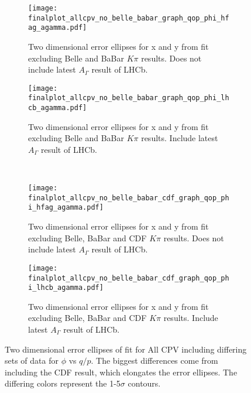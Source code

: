 \begin{figure}[tb]
  \begin{center}
    \begin{subfigure}[b]{0.4\textwidth}
      \centering
      \texttt{[image: finalplot\_allcpv\_no\_belle\_babar\_graph\_qop\_phi\_hfag\_agamma.pdf]}
      \caption{Two dimensional error ellipses for x and y from fit excluding Belle and BaBar $K\pi$ results. Does not include latest $A_\Gamma$ result of LHCb.}
      \label{fig:xy_all_cpv_no_agamma}
    \end{subfigure}%
    \hspace{2mm}
    \begin{subfigure}[b]{0.4\textwidth}
      \centering
      \texttt{[image: finalplot\_allcpv\_no\_belle\_babar\_graph\_qop\_phi\_lhcb\_agamma.pdf]}
      \caption{Two dimensional error ellipses for x and y from fit excluding Belle and BaBar $K\pi$ results. Include latest $A_\Gamma$ result of LHCb.}
      \label{fig:xy_all_cpv_with_agamma}
    \end{subfigure}%
        \\
    \begin{subfigure}[b]{0.4\textwidth}
      \centering
      \texttt{[image: finalplot\_allcpv\_no\_belle\_babar\_cdf\_graph\_qop\_phi\_hfag\_agamma.pdf]}
      \caption{Two dimensional error ellipses for x and y from fit excluding Belle, BaBar and CDF $K\pi$ results. Does not include latest $A_\Gamma$ result of LHCb.}
      \label{fig:xy_all_cpv_no_agamma}
    \end{subfigure}%
    \hspace{2mm}
    \begin{subfigure}[b]{0.4\textwidth}
      \centering
      \texttt{[image: finalplot\_allcpv\_no\_belle\_babar\_cdf\_graph\_qop\_phi\_lhcb\_agamma.pdf]}
      \caption{Two dimensional error ellipses for x and y from fit excluding Belle, BaBar and CDF $K\pi$ results. Include latest $A_\Gamma$ result of LHCb.}
      \label{fig:xy_all_cpv_with_agamma}
    \end{subfigure}%
  \end{center}
  \caption{Two dimensional error ellipses of fit for All CPV including differing sets of data for $\phi$ vs $q/p$. The biggest differences come from including the CDF result, which elongates the error ellipses. The differing colors represent the 1-5$\sigma$ contours.}
  \label{fig:xy_all_variations}
\end{figure}

%
